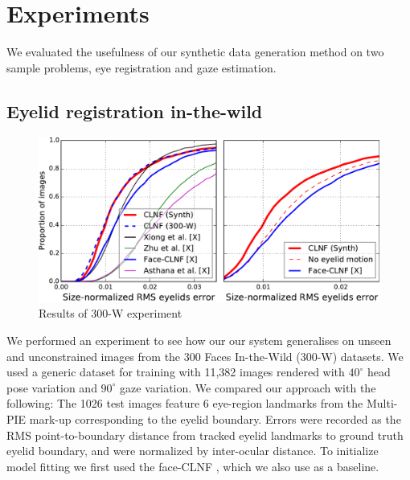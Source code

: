 
\section{Experiments}

% 

We evaluated the usefulness of our synthetic data generation method on two sample problems, eye registration and gaze estimation.


\subsection{Eyelid registration in-the-wild}

\begin{figure}
    \centering
    \includegraphics[width=\columnwidth]{figs/CLNF_300W_experiment.pdf}
    \caption{Results of 300-W experiment}
    \label{fig:clnf_results_wild}
\end{figure}



We performed an experiment to see how our our system generalises on unseen and unconstrained images from the 300 Faces In-the-Wild (300-W) \cite{sagonas2013300} datasets.
We used a generic \dataset dataset for training with 11,382 images rendered with $40^{\circ}$ head pose variation and $90^{\circ}$ gaze variation.
We compared our approach with the following: 
The 1026 test images feature 6 eye-region landmarks from the Multi-PIE \cite{gross2010multi} mark-up corresponding to the eyelid boundary. Errors were recorded as the RMS point-to-boundary distance from tracked eyelid landmarks to ground truth eyelid boundary, and were normalized by inter-ocular distance.
To initialize model fitting we first used the face-CLNF \cite{baltrusaitis2013constrained}, which we also use as a baseline.

